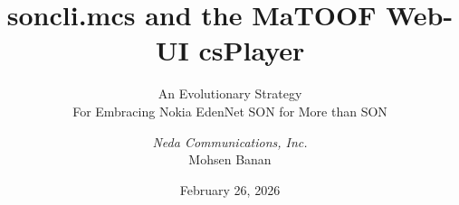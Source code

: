 
\begin{whenOrg}
\end{whenOrg}
\title[soncli.mcs and the MaTOOF Web-UI csPlayer]
{soncli.mcs and the MaTOOF Web-UI csPlayer}

\subtitle[An Evolutionary Strategy For Embracing Nokia EdenNet SON for More than SON]
{An Evolutionary Strategy\\For Embracing Nokia EdenNet SON for More than SON}

\author[Neda Communications, Inc. -- Mohsen Banan]
{\textit{Neda Communications, Inc.}\\
    \vspace{0.1in}
  Mohsen Banan\\
}


\date[February 26, 2026]
{February 26, 2026}

\subject{soncli.mcs and the MaTOOF Web-UI csPlayer}

